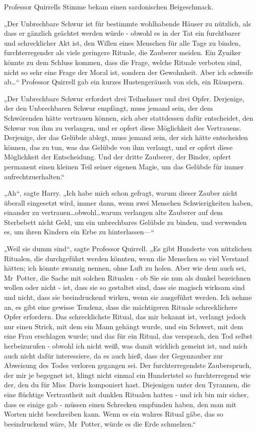 {Professor Quirrells Stimme bekam einen sardonischen Beigeschmack.

„Der Unbrechbare Schwur ist für bestimmte wohlhabende Häuser zu nützlich, als dass er gänzlich geächtet werden würde - obwohl es in der Tat ein furchtbarer und schrecklicher Akt ist, den Willen eines Menschen für alle Tage zu binden, furchterregender als viele geringere Rituale, die Zauberer meiden. Ein Zyniker könnte zu dem Schluss kommen, dass die Frage, welche Rituale verboten sind, nicht so sehr eine Frage der Moral ist, sondern der Gewohnheit. Aber ich schweife ab…“ Professor Quirrell gab ein kurzes Hustengeräusch von sich, ein Räuspern.

„Der Unbrechbare Schwur erfordert drei Teilnehmer und drei Opfer. Derjenige, der den Unbrechbaren Schwur empfängt, muss jemand sein, der dem Schwörenden hätte vertrauen können, sich aber stattdessen dafür entscheidet, den Schwur von ihm zu verlangen, und er opfert diese Möglichkeit des Vertrauens. Derjenige, der das Gelübde ablegt, muss jemand sein, der sich hätte entscheiden können, das zu tun, was das Gelübde von ihm verlangt, und er opfert diese Möglichkeit der Entscheidung. Und der dritte Zauberer, der Binder, opfert permanent einen kleinen Teil seiner eigenen Magie, um das Gelübde für immer aufrechtzuerhalten.“

„Ah“, sagte Harry. „Ich habe mich schon gefragt, warum dieser Zauber nicht überall eingesetzt wird, immer dann, wenn zwei Menschen Schwierigkeiten haben, einander zu vertrauen…obwohl…warum verlangen alte Zauberer auf dem Sterbebett nicht Geld, um ein unbrechbares Gelübde zu binden, und verwenden es, um ihren Kindern ein Erbe zu hinterlassen—“

„Weil sie dumm sind“, sagte Professor Quirrell. „Es gibt Hunderte von nützlichen Ritualen, die durchgeführt werden könnten, wenn die Menschen so viel Verstand hätten; ich könnte zwanzig nennen, ohne Luft zu holen. Aber wie dem auch sei, Mr~Potter, die Sache mit solchen Ritualen - ob Sie sie nun als dunkel bezeichnen wollen oder nicht - ist, dass sie so gestaltet sind, dass sie magisch wirksam sind und nicht, dass sie beeindruckend wirken, wenn sie ausgeführt werden. Ich nehme an, es gibt eine gewisse Tendenz, dass die mächtigeren Rituale schrecklichere Opfer erfordern. Das schrecklichste Ritual, das mir bekannt ist, verlangt jedoch nur einen Strick, mit dem ein Mann gehängt wurde, und ein Schwert, mit dem eine Frau erschlagen wurde; und das für ein Ritual, das versprach, den Tod selbst herbeizurufen - obwohl ich nicht weiß, was damit wirklich gemeint ist, und mich auch nicht dafür interessiere, da es auch hieß, dass der Gegenzauber zur Abweisung des Todes verloren gegangen sei. Der furchterregendste Zauberspruch, der mir je begegnet ist, klingt nicht einmal ein Hundertstel so furchterregend wie der, den du für Miss~Davis komponiert hast. Diejenigen unter den Tyrannen, die eine flüchtige Vertrautheit mit dunklen Ritualen hatten - und ich bin mir sicher, dass es einige gab - müssen einen Schrecken empfunden haben, den man mit Worten nicht beschreiben kann. Wenn es ein wahres Ritual gäbe, das so beeindruckend wäre, Mr~Potter, würde es die Erde schmelzen.“

}
